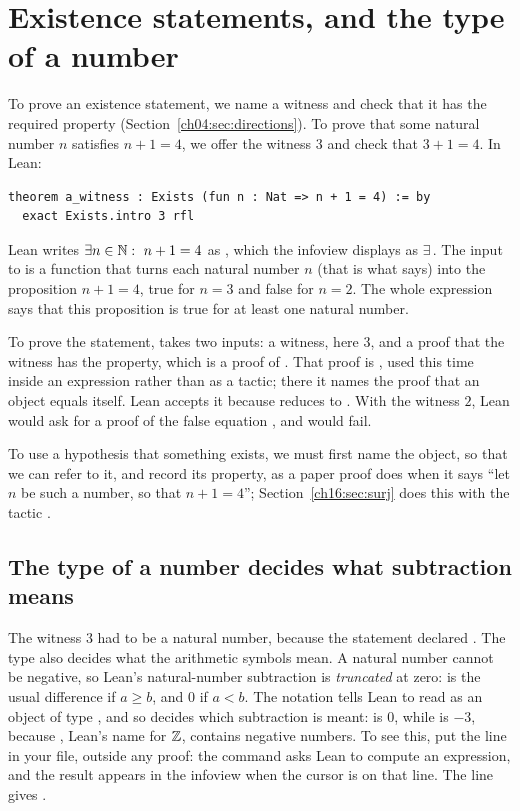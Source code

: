 \section{Existence statements, and the type of a number}\label{ch15:sec:exists}
To prove an existence statement, we name a witness and check that it has the required property (Section~\ref{ch04:sec:directions}). To prove that some natural number $n$ satisfies $n+1=4$, we offer the witness $3$ and check that $3+1=4$. In Lean:
\par\noindent\begin{minipage}{\linewidth}
\begin{lstlisting}
theorem a_witness : Exists (fun n : Nat => n + 1 = 4) := by
  exact Exists.intro 3 rfl
\end{lstlisting}
\end{minipage}\par

Lean writes $\exists n\in\NN:\ n+1=4$ as , which the infoview displays as $\exists$\,. The input to  is a function that turns each natural number $n$ (that is what  says) into the proposition $n+1=4$, true for $n=3$ and false for $n=2$. The whole expression says that this proposition is true for at least one natural number.

To prove the statement,  takes two inputs: a witness, here $3$, and a proof that the witness has the property, which is a proof of . That proof is , used this time inside an expression rather than as a tactic; there it names the proof that an object equals itself. Lean accepts it because  reduces to . With the witness $2$, Lean would ask for a proof of the false equation , and  would fail.

To use a hypothesis that something exists, we must first name the object, so that we can refer to it, and record its property, as a paper proof does when it says ``let $n$ be such a number, so that $n+1=4$''; Section~\ref{ch16:sec:surj} does this with the tactic .

\subsection*{The type of a number decides what subtraction means}
The witness $3$ had to be a natural number, because the statement declared . The type also decides what the arithmetic symbols mean. A natural number cannot be negative, so Lean's natural-number subtraction is \emph{truncated} at zero:  is the usual difference if $a\ge b$, and $0$ if $a<b$. The notation  tells Lean to read  as an object of type , and so decides which subtraction is meant:  is $0$, while  is $-3$, because , Lean's name for $\mathbb Z$, contains negative numbers. To see this, put the line  in your file, outside any proof: the command  asks Lean to compute an expression, and the result  appears in the infoview when the cursor is on that line. The line  gives .


